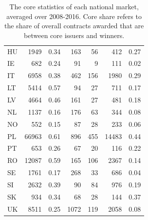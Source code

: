\begin{table}
\begin{tabular}{lrrrrrr}
HU      &             1949 &                 0.34 &            163 &             56 &          412 &          0.27 \\
IE      &              682 &                 0.24 &             91 &              9 &          111 &          0.02 \\
IT      &             6958 &                 0.38 &            462 &            156 &         1980 &          0.29 \\
LT      &             5414 &                 0.57 &             94 &             27 &          711 &          0.17 \\
LV      &             4664 &                 0.46 &            161 &             27 &          481 &          0.18 \\
NL      &             1137 &                 0.16 &            176 &             63 &          344 &          0.08 \\
NO      &              552 &                 0.15 &             87 &             28 &          233 &          0.06 \\
PL      &            66963 &                 0.61 &            896 &            455 &        14483 &          0.44 \\
PT      &              653 &                 0.26 &             67 &             20 &          116 &          0.22 \\
RO      &            12087 &                 0.59 &            165 &            106 &         2367 &          0.14 \\
SE      &             1761 &                 0.17 &            268 &             33 &          686 &          0.04 \\
SI      &             2632 &                 0.39 &             90 &             84 &          976 &          0.19 \\
SK      &              934 &                 0.34 &             68 &             28 &          144 &          0.37 \\
UK      &             8511 &                 0.25 &           1072 &            119 &         2058 &          0.08 \\
\bottomrule
\end{tabular}
\caption[Summary statistics of market cores.]{The core statistics of each national market, averaged over 2008-2016. Core share refers to the share of overall contracts awarded that are between core issuers and winners.}
\label{tab:core_stats}
\end{table}




